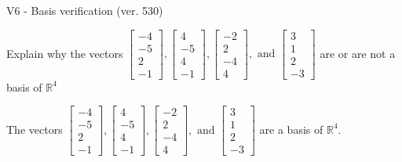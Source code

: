 \begin{exercise}
  \begin{exerciseTitle}V6 - Basis verification (ver. 530)\end{exerciseTitle}
  \begin{exerciseStatement}
    Explain why the vectors \(\left[\begin{array}{r}
-4 \\
-5 \\
2 \\
-1
\end{array}\right] , \left[\begin{array}{r}
4 \\
-5 \\
4 \\
-1
\end{array}\right] , \left[\begin{array}{r}
-2 \\
2 \\
-4 \\
4
\end{array}\right] , \text{ and } \left[\begin{array}{r}
3 \\
1 \\
2 \\
-3
\end{array}\right]\) are or are not a basis of \(\mathbb{R}^4\)	


  \end{exerciseStatement}
  \begin{exerciseAnswer}
   The vectors \(\left[\begin{array}{r}
-4 \\
-5 \\
2 \\
-1
\end{array}\right] , \left[\begin{array}{r}
4 \\
-5 \\
4 \\
-1
\end{array}\right] , \left[\begin{array}{r}
-2 \\
2 \\
-4 \\
4
\end{array}\right] , \text{ and } \left[\begin{array}{r}
3 \\
1 \\
2 \\
-3
\end{array}\right]\) 
  	 are  a basis of \(\mathbb{R}^4\).
  


  \end{exerciseAnswer}
\end{exercise}